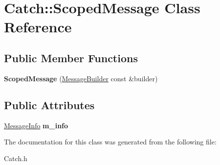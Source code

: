 \hypertarget{class_catch_1_1_scoped_message}{\section{Catch\-:\-:Scoped\-Message Class Reference}
\label{class_catch_1_1_scoped_message}
}
\subsection*{Public Member Functions}
\begin{DoxyCompactItemize}
\item 
\hypertarget{class_catch_1_1_scoped_message_a5cc59f0f2ebe840e6607f83004d49a17}{{\bfseries Scoped\-Message} (\hyperlink{struct_catch_1_1_message_builder}{Message\-Builder} const \&builder)}\label{class_catch_1_1_scoped_message_a5cc59f0f2ebe840e6607f83004d49a17}

\end{DoxyCompactItemize}
\subsection*{Public Attributes}
\begin{DoxyCompactItemize}
\item 
\hypertarget{class_catch_1_1_scoped_message_ae6e1476f389cc6e1586f033b3747b27b}{\hyperlink{struct_catch_1_1_message_info}{Message\-Info} {\bfseries m\-\_\-info}}\label{class_catch_1_1_scoped_message_ae6e1476f389cc6e1586f033b3747b27b}

\end{DoxyCompactItemize}


The documentation for this class was generated from the following file\-:\begin{DoxyCompactItemize}
\item 
Catch.\-h\end{DoxyCompactItemize}
